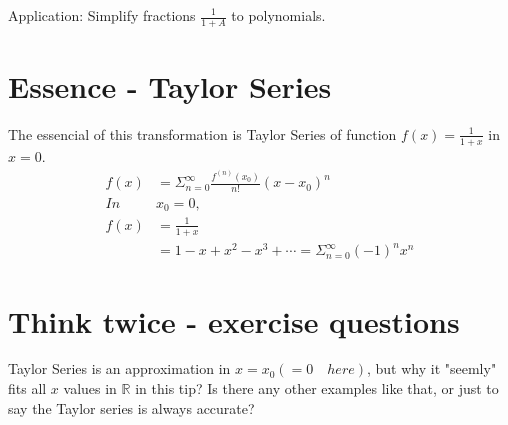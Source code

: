 \documentclass{Math_Note}
\begin{document}
Application: Simplify fractions $\frac{1}{1+A}$ to polynomials.

\section{Essence - Taylor Series}
The essencial of this transformation is Taylor Series of function $f(x) = \frac{1}{1+x}$ in $x=0$. \\

\begin{equation}
    \begin{split}
        f(x) &= \Sigma_{n=0}^{\infty} \frac{f^{(n)}(x_{0})}{n!}\left(x-x_{0}\right)^{n} \\
        In \quad &x_{0} = 0, \\
        f(x) &= \frac{1}{1+x} \\
        &= 1-x+x^{2}-x^{3}+\cdots = \Sigma_{n=0}^{\infty}(-1)^{n}x^{n}
    \end{split}
\end{equation}

\section{Think twice - exercise questions}
Taylor Series is an approximation in $x = x_{0} \left(= 0 \quad here\right)$, but 
why it "seemly" fits all $x$ values in $\mathbb{R}$ in this tip? 
Is there any other examples like that, or just to say the Taylor series is always accurate?
\end{document}
